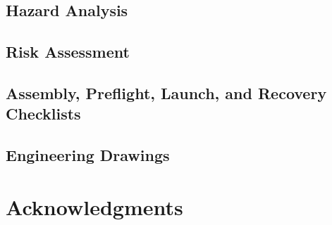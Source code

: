 \documentclass[conf]{new-aiaa}
\begin{document}
\subsection{Hazard Analysis}

\begin{quotation}
\HazardAnalysisDescription{}
\end{quotation}

\subsection{Risk Assessment}

\begin{quotation}
\RiskAssessmentDescription{}
\end{quotation}

\subsection{Assembly, Preflight, Launch, and Recovery Checklists}

\begin{quotation}
\ChecklistsDescription{}
\end{quotation}

\subsection{Engineering Drawings}

\begin{quotation}
\DrawingsDescription{}
\end{quotation}

\section*{Acknowledgments}

% 
\end{document}
